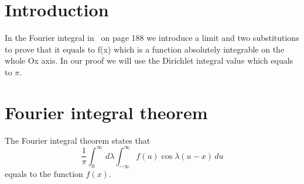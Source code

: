 \documentclass[12pt]{article}
\numberwithin{equation}{section}
\begin{document}






\section{Introduction}\label{sec:intro}

In the Fourier integral in~\cite{book_by_Tolstov} on page 188 we introduce a limit and two
substitutions to prove that it equals to f(x) which is a function absolutely
integrable on the whole Ox axis. In our proof we will use the Dirichlet integral
value which equals to $\pi$\@.







\section{Fourier integral theorem}\label{sec:fint}

The Fourier integral theorem states that
\begin{equation}
\frac{1}{\pi} \int_{0}^{\infty} \, d\lambda \int_{-\infty}^{\infty} f(u) \cos \lambda(u-x) \, du
\end{equation}
equals to the function $f(x)$\@.
\end{document}

